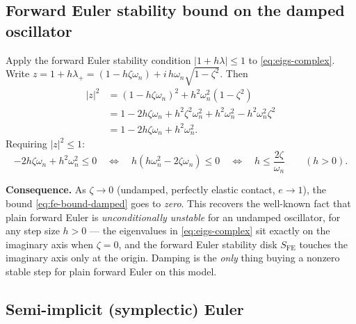 \documentclass[11pt]{article}
\begin{document}
\subsection{Forward Euler stability bound on the damped oscillator}

Apply the forward Euler stability condition $|1 + h\lambda| \le 1$ to \eqref{eq:eigs-complex}.
Write $z = 1 + h\lambda_+ = (1 - h\zeta\omega_n) + i\, h\omega_n\sqrt{1-\zeta^2}$. Then
\begin{align}
  |z|^2 &= (1 - h\zeta\omega_n)^2 + h^2\omega_n^2(1-\zeta^2) \\
        &= 1 - 2h\zeta\omega_n + h^2\zeta^2\omega_n^2 + h^2\omega_n^2 - h^2\omega_n^2\zeta^2 \\
        &= 1 - 2h\zeta\omega_n + h^2\omega_n^2.
\end{align}
Requiring $|z|^2 \le 1$:
\begin{equation}
  -2h\zeta\omega_n + h^2\omega_n^2 \le 0
  \quad\Longleftrightarrow\quad
  h\left(h\omega_n^2 - 2\zeta\omega_n\right) \le 0
  \quad\Longleftrightarrow\quad
  h \le \frac{2\zeta}{\omega_n} \qquad (h > 0).
  \label{eq:fe-bound-damped}
\end{equation}

\textbf{Consequence.} As $\zeta \to 0$ (undamped, perfectly elastic contact, $e \to 1$),
the bound \eqref{eq:fe-bound-damped} goes to \emph{zero}. This recovers the well-known fact
that plain forward Euler is \emph{unconditionally unstable} for an undamped oscillator, for
any step size $h > 0$ — the eigenvalues in \eqref{eq:eigs-complex} sit exactly on the
imaginary axis when $\zeta=0$, and the forward Euler stability disk $S_{\text{FE}}$ touches
the imaginary axis only at the origin. Damping is the \emph{only} thing buying a nonzero
stable step for plain forward Euler on this model.

\subsection{Semi-implicit (symplectic) Euler}
\end{document}
